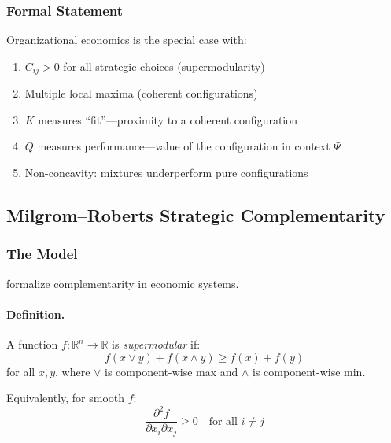 \subsubsection{Formal Statement}

\begin{proposition}
Organizational economics is the special case with:
\begin{enumerate}
  \item $C_{ij} > 0$ for all strategic choices (supermodularity)
  \item Multiple local maxima (coherent configurations)
  \item $K$ measures ``fit''---proximity to a coherent configuration
  \item $Q$ measures performance---value of the configuration in context $\Psi$
  \item Non-concavity: mixtures underperform pure configurations
\end{enumerate}
\end{proposition}

\subsection{Milgrom--Roberts Strategic Complementarity}
\label{app:milgromroberts}

\subsubsection{The Model}

\citet{milgromroberts1990,milgromroberts1995} formalize complementarity in economic systems.

\paragraph{Definition.}
A function $f: \mathbb{R}^n \to \mathbb{R}$ is \emph{supermodular} if:
\begin{equation}
  f(x \vee y) + f(x \wedge y) \geq f(x) + f(y)
\end{equation}
for all $x, y$, where $\vee$ is component-wise max and $\wedge$ is component-wise min.

Equivalently, for smooth $f$:
\begin{equation}
  \frac{\partial^2 f}{\partial x_i \partial x_j} \geq 0 \quad \text{for all } i \neq j
\end{equation}

